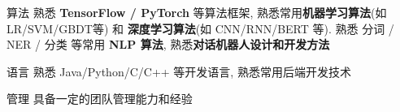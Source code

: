 


\begin{cvskills}
	
	
	\cvskill
	{算法} %
	{熟悉 \textbf{TensorFlow / PyTorch} 等算法框架, 熟悉常用\textbf{机器学习算法}(如LR/SVM/GBDT等) 和 \textbf{深度学习算法}(如 CNN/RNN/BERT 等). 熟悉 分词 / NER / 分类 等常用 \textbf{NLP 算法}, 熟悉\textbf{对话机器人设计和开发方法}} %
	
	
	\cvskill
	{语言} %
	{熟悉 Java/Python/C/C++ 等开发语言, 熟悉常用后端开发技术} %
	
	
	\cvskill
	{管理} %
	{具备一定的团队管理能力和经验} %
	
	
\end{cvskills}